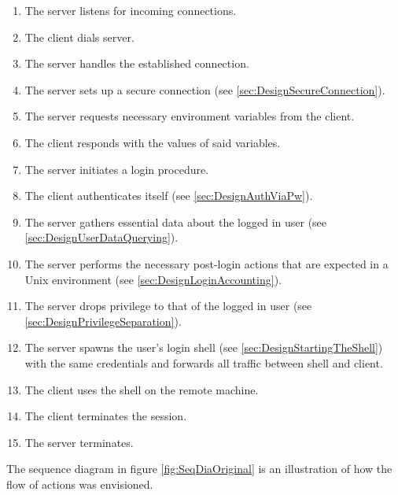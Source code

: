 \documentclass[10pt,a4paper,titlepage,twoside,english,final]{zhawreprt}
\begin{document}
\begin{enumerate}
\item The server listens for incoming connections.
\item The client dials server.
\item The server handles the established connection.
\item The server sets up a secure connection (see \ref{sec:DesignSecureConnection}).
\item The server requests necessary environment variables from the client.
\item The client responds with the values of said variables.
\item The server initiates a \gls{login} procedure.
\item The client authenticates itself (see \ref{sec:DesignAuthViaPw}).
\item The server gathers essential data about the logged in user (see \ref{sec:DesignUserDataQuerying}).
\item The server performs the necessary post-\gls{login} actions that are expected in a \gls{Unix} environment (see \ref{sec:DesignLoginAccounting}).
\item The server drops privilege to that of the logged in user (see \ref{sec:DesignPrivilegeSeparation}).
\item The server spawns the user's \gls{login} \gls{shell} (see \ref{sec:DesignStartingTheShell}) with the same credentials and forwards all traffic between \gls{shell} and client.
\item The client uses the \gls{shell} on the remote machine.
\item The client terminates the session.
\item The server terminates.
\end{enumerate}

The sequence diagram in figure \ref{fig:SeqDiaOriginal} is an illustration of how the flow of actions was envisioned.
\end{document}
